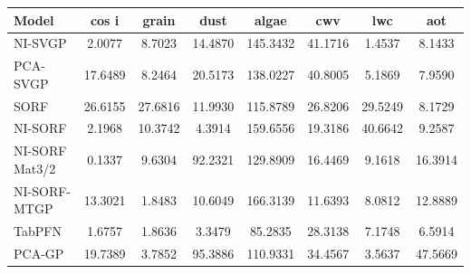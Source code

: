 \begin{tabular}{lccccccc}
\toprule
Model & cos i & grain & dust & algae & cwv & lwc & aot \\
\midrule
NI-SVGP & 2.0077 & 8.7023 & 14.4870 & 145.3432 & 41.1716 & 1.4537 & 8.1433 \\
PCA-SVGP & 17.6489 & 8.2464 & 20.5173 & 138.0227 & 40.8005 & 5.1869 & 7.9590 \\
SORF & 26.6155 & 27.6816 & 11.9930 & 115.8789 & 26.8206 & 29.5249 & 8.1729 \\
NI-SORF & 2.1968 & 10.3742 & 4.3914 & 159.6556 & 19.3186 & 40.6642 & 9.2587 \\
NI-SORF Mat3/2 & 0.1337 & 9.6304 & 92.2321 & 129.8909 & 16.4469 & 9.1618 & 16.3914 \\
NI-SORF-MTGP & 13.3021 & 1.8483 & 10.6049 & 166.3139 & 11.6393 & 8.0812 & 12.8889 \\
TabPFN & 1.6757 & 1.8636 & 3.3479 & 85.2835 & 28.3138 & 7.1748 & 6.5914 \\
PCA-GP & 19.7389 & 3.7852 & 95.3886 & 110.9331 & 34.4567 & 3.5637 & 47.5669 \\
\bottomrule
\end{tabular}